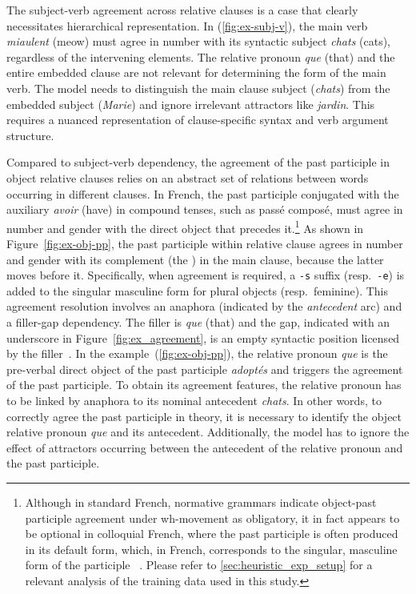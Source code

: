 The subject-verb agreement across relative clauses is a case that clearly necessitates hierarchical representation. In (\ref{fig:ex-subj-v}), the main verb \textit{miaulent} (meow) must agree in number with its syntactic subject \textit{chats} (cats), regardless of the intervening elements. The relative pronoun \textit{que} (that) and the entire embedded clause are not relevant for determining the form of the main verb. The model needs to distinguish the main clause subject (\textit{chats}) from the embedded subject (\textit{Marie}) and ignore irrelevant attractors like \textit{jardin}. This requires a nuanced representation of clause-specific syntax and verb argument structure.

Compared to subject-verb dependency, the agreement of the past participle in object relative clauses relies on an abstract set of relations
between words occurring in different clauses. In French, the past participle conjugated with the auxiliary \textit{avoir} (have) in compound tenses, such as passé composé, must agree in number and gender with the direct object that precedes it.\footnote{Although in standard French, normative grammars indicate object-past participle agreement under wh-movement as obligatory, it in fact appears to be optional in colloquial French, where the past participle is often produced in its default form, which, in French, corresponds to the singular, masculine form of the participle ~\citep{belletti2017past}. Please refer to \textsection\ref{sec:heuristic_exp_setup} for a relevant analysis of the training data used in this study.} As shown in Figure~\ref{fig:ex-obj-pp}, the past participle within relative clause agrees in number and gender with its complement (the \cue) in the main clause, because the latter moves before it. Specifically, when agreement is required, a \texttt{-s} suffix (resp.\
\texttt{-e}) is added to the singular masculine form for plural objects
(resp.\ feminine). This agreement resolution involves an anaphora (indicated by the \textit{antecedent} arc)
and a filler-gap dependency. The filler is \textit{que} (that) and the gap, indicated with an underscore in Figure~\ref{fig:ex_agreement}, is an empty syntactic position licensed by the filler~\citep{kayne1989facets}. In the example~(\ref{fig:ex-obj-pp}), the relative pronoun
\textit{que} is the pre-verbal direct object of the past participle
\textit{adoptés} and triggers the agreement of the
past participle. To obtain its agreement features, the relative
pronoun has to be linked by anaphora to its nominal antecedent
\textit{chats}. In other words, to correctly agree the past participle
in theory, it is necessary to identify the object relative pronoun \textit{que} and
its antecedent. Additionally, the model has to ignore the effect of attractors
occurring between the antecedent of the relative pronoun and the past
participle. 


